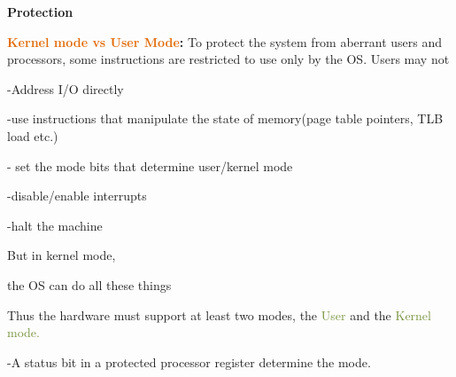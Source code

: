 \documentclass[12pt]{article}
\begin{document}
\vspace{\baselineskip}
\begin{Center}
{\fontsize{24pt}{28.8pt}\selectfont \textbf{Protection}\par}
\end{Center}\par

{\fontsize{16pt}{19.2pt}\selectfont \textbf{\textcolor[HTML]{E36C0A}{Kernel mode vs User Mode}: }To protect the system from aberrant users and processors, some instructions are restricted to use only by the OS. Users may not\par}\par

{\fontsize{16pt}{19.2pt}\selectfont -Address I/O directly\par}\par

{\fontsize{16pt}{19.2pt}\selectfont -use instructions that manipulate the state of memory(page table pointers, TLB load etc.)\par}\par


\vspace{\baselineskip}
{\fontsize{16pt}{19.2pt}\selectfont - set the mode bits that determine user/kernel mode\par}\par

{\fontsize{16pt}{19.2pt}\selectfont -disable/enable interrupts\par}\par

{\fontsize{16pt}{19.2pt}\selectfont -halt the machine\par}\par

{\fontsize{18pt}{21.6pt}\selectfont But in kernel mode, {\fontsize{16pt}{19.2pt}\selectfont the OS can do all these things\par}\par}\par

{\fontsize{16pt}{19.2pt}\selectfont Thus the hardware must support at least two modes, the \textcolor[HTML]{76923C}{User} and the \textcolor[HTML]{76923C}{Kernel mode.}\par}\par

{\fontsize{16pt}{19.2pt}\selectfont -A status bit in a protected processor register determine the mode.\par}\par
\end{document}
